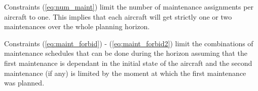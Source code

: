 \documentclass[a4paper,onecolumn,fleqn]{article}
\begin{document}
    Constraints (\ref{eq:num_maint}) limit the number of maintenance assignments per aircraft to one. This implies that each aircraft will get strictly one or two maintenances over the whole planning horizon.

    Constraints (\ref{eq:maint_forbid}) - (\ref{eq:maint_forbid2}) limit the combinations of maintenance schedules that can be done during the horizon assuming that the first maintenance is dependant in the initial state of the aircraft and the second maintenance (if any) is limited by the moment at which the first maintenance was planned.
\end{document}
